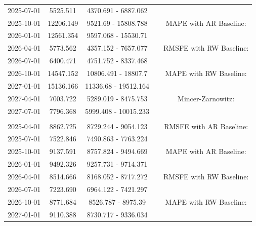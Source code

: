 \begin{table}
\begin{tabular}[t]{ccccc}
\hspace{1em}2025-07-01 & 5525.511 & 4370.691 - 6887.062 &  & \\
\hspace{1em}2025-10-01 & 12206.149 & 9521.69 - 15808.788 &  & MAPE with AR Baseline:\\
\hspace{1em}2026-01-01 & 12561.354 & 9597.068 - 15530.71 &  & \\
\hspace{1em}2026-04-01 & 5773.562 & 4357.152 - 7657.077 &  & RMSFE with RW Baseline:\\
\hspace{1em}2026-07-01 & 6400.471 & 4751.752 - 8337.468 &  & \\
\hspace{1em}2026-10-01 & 14547.152 & 10806.491 - 18807.7 &  & MAPE with RW Baseline:\\
\hspace{1em}2027-01-01 & 15136.166 & 11336.68 - 19512.164 &  & \\
\hspace{1em}2027-04-01 & 7003.722 & 5289.019 - 8475.753 &  & Mincer-Zarnowitz:\\
\hspace{1em}2027-07-01 & 7796.368 & 5999.408 - 10015.233 &  & \\
\addlinespace[0.3em]
\multicolumn{5}{l}{\textbf{EmiCO2ManInd}}\\
\hspace{1em}2025-04-01 & 8862.725 & 8729.244 - 9054.123 &  & RMSFE with AR Baseline:\\
\hspace{1em}2025-07-01 & 7522.846 & 7490.863 - 7763.224 &  & \\
\hspace{1em}2025-10-01 & 9137.591 & 8757.824 - 9494.669 &  & MAPE with AR Baseline:\\
\hspace{1em}2026-01-01 & 9492.326 & 9257.731 - 9714.371 &  & \\
\hspace{1em}2026-04-01 & 8514.666 & 8168.052 - 8717.272 &  & RMSFE with RW Baseline:\\
\hspace{1em}2026-07-01 & 7223.690 & 6964.122 - 7421.297 &  & \\
\hspace{1em}2026-10-01 & 8771.684 & 8526.787 - 8975.39 &  & MAPE with RW Baseline:\\
\hspace{1em}2027-01-01 & 9110.388 & 8730.717 - 9336.034 &  & \\

\end{tabular}
\end{table}
